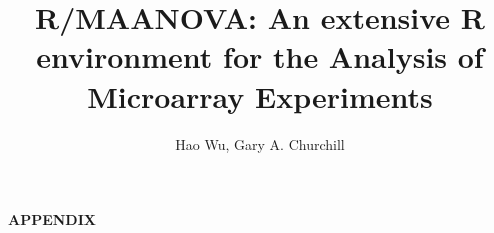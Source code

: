 \documentclass[12pt]{article}
\author{Hao Wu, Gary A. Churchill}
\begin{document}
\title{R/MAANOVA: An extensive R environment for the Analysis of Microarray Experiments}

\maketitle
\tableofcontents











\nocite{benjamin:1995}
\nocite{benjamin:2001}
\nocite{churchill:2002}
\nocite{cui:2003a}
\nocite{cui:2003b}
\nocite{cui:2005}
\nocite{felsenstein:1985}
\nocite{Kerr:2001a}
\nocite{kerr:2001b}
\nocite{kerr:2001c}
\nocite{kerr:2000}
\nocite{kerr:2002}
\nocite{littell:1996}
\nocite{margush:1981}
\nocite{mclean:1991}
\nocite{prichard:2001}
\nocite{witk:2001}
\nocite{wolfinger:2001}
\nocite{yang:2002}
\nocite{searle:1992}
\nocite{sas:1999}

\newpage
\begin{center}
{\large\bf APPENDIX}
\end{center}

\begin{appendix}
%



\end{appendix}
\end{document}
